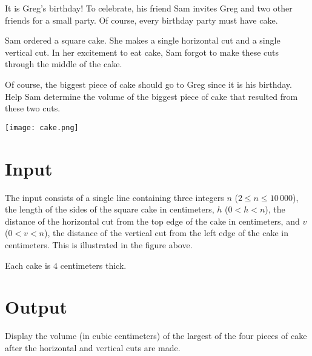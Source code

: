 
It is Greg's birthday! To celebrate, his friend Sam invites Greg and
two other friends for a small party. Of course, every birthday party
must have cake.

Sam ordered a square cake.  She makes a single horizontal cut and a
single vertical cut.  In her excitement to eat cake, Sam forgot to
make these cuts through the middle of the cake.

Of course, the biggest piece of cake should go to Greg since it is his
birthday. Help Sam determine the volume of the
biggest piece of cake that resulted from these two cuts.

\begin{center}
  \texttt{[image: cake.png]}
\end{center}

\section*{Input}
The input consists of a single line containing three integers $n$ ($2 \leq n \leq 10\,000$),
the length of the sides of the square cake in centimeters, $h$ ($0 < h < n$), 
the distance of the horizontal cut from the top edge of the cake
in centimeters, and $v$ ($0 < v < n$), the distance of the vertical cut
from the left edge of the cake in centimeters.  This is illustrated in
the figure above.

Each cake is $4$ centimeters thick.

\section*{Output}
Display the volume (in cubic centimeters) of the largest of the four pieces
of cake after the horizontal and vertical cuts are made.
